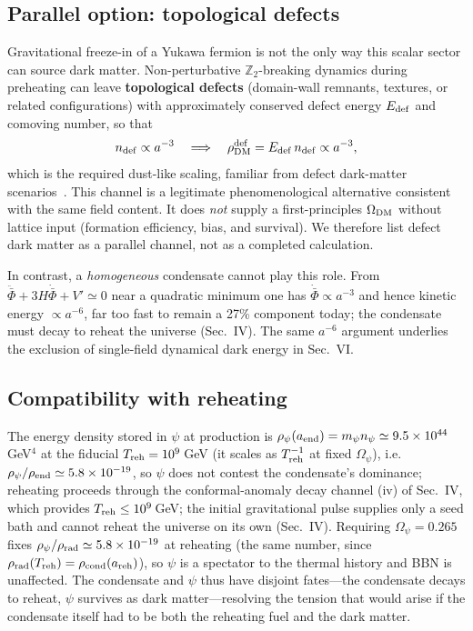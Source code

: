 \documentclass[pdflatex,sn-mathphys-num]{sn-jnl}
\providecommand{\lesssim}{\leq}
\newcommand{\Ztwo}{\mathbb{Z}_2}
\theoremstyle{thmstyleone}
\begin{document}
\subsection{Parallel option: topological defects}

Gravitational freeze-in of a Yukawa fermion is not the only way this scalar sector can source dark matter. Non-perturbative $\Ztwo$-breaking dynamics during preheating can leave \textbf{topological defects} (domain-wall remnants, textures, or related configurations) with approximately conserved defect energy $E_{\rm def}$ and comoving number, so that
\begin{equation}
n_{\rm def}\propto a^{-3}
\quad\Longrightarrow\quad
\rho_{\rm DM}^{\rm def}=E_{\rm def}\,n_{\rm def}\propto a^{-3},
\end{equation}
which is the required dust-like scaling, familiar from defect dark-matter scenarios~\cite{Vilenkin2000}. This channel is a legitimate phenomenological alternative consistent with the same field content. It does \emph{not} supply a first-principles $\Omega_{\rm DM}$ without lattice input (formation efficiency, bias, and survival). We therefore list defect dark matter as a parallel channel, not as a completed calculation.

In contrast, a \emph{homogeneous} condensate cannot play this role. From $\ddot{\bar\Phi}+3H\dot{\bar\Phi}+V'\simeq0$ near a quadratic minimum one has $\dot{\bar\Phi}\propto a^{-3}$ and hence kinetic energy $\propto a^{-6}$, far too fast to remain a 27\% component today; the condensate must decay to reheat the universe (Sec.~IV). The same $a^{-6}$ argument underlies the exclusion of single-field dynamical dark energy in Sec.~VI.

\subsection{Compatibility with reheating}

The energy density stored in $\psi$ at production is $\rho_\psi(a_{\rm end})=m_\psi n_\psi\simeq9.5\times10^{44}\,$GeV$^4$ at the fiducial $T_{\rm reh}=10^{9}\,$GeV (it scales as $T_{\rm reh}^{-1}$ at fixed $\Omega_\psi$), i.e.\ $\rho_\psi/\rho_{\rm end}\simeq5.8\times10^{-19}$, so $\psi$ does not contest the condensate's dominance; reheating proceeds through the conformal-anomaly decay channel (iv) of Sec.~IV, which provides $T_{\rm reh}\lesssim10^9\,$GeV; the initial gravitational pulse supplies only a seed bath and cannot reheat the universe on its own (Sec.~IV). Requiring $\Omega_\psi=0.265$ fixes $\rho_\psi/\rho_{\rm rad}\simeq5.8\times10^{-19}$ at reheating (the same number, since $\rho_{\rm rad}(T_{\rm reh})=\rho_{\rm cond}(a_{\rm reh})$), so $\psi$ is a spectator to the thermal history and BBN is unaffected. The condensate and $\psi$ thus have disjoint fates---the condensate decays to reheat, $\psi$ survives as dark matter---resolving the tension that would arise if the condensate itself had to be both the reheating fuel and the dark matter.
\end{document}
